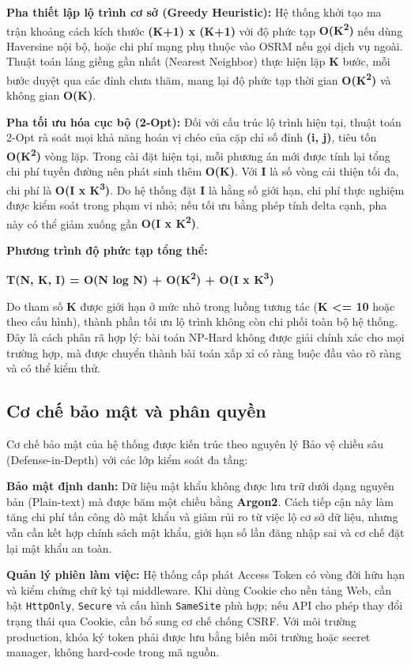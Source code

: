 \documentclass[12pt, a4paper]{article}
\begin{document}
\textbf{Pha thiết lập lộ trình cơ sở (Greedy Heuristic):}
Hệ thống khởi tạo ma trận khoảng cách kích thước \textbf{(K+1) x (K+1)} với độ phức tạp \textbf{O(K\textsuperscript{2})} nếu dùng Haversine nội bộ, hoặc chi phí mạng phụ thuộc vào OSRM nếu gọi dịch vụ ngoài. Thuật toán láng giềng gần nhất (Nearest Neighbor) thực hiện lặp \textbf{K} bước, mỗi bước duyệt qua các đỉnh chưa thăm, mang lại độ phức tạp thời gian \textbf{O(K\textsuperscript{2})} và không gian \textbf{O(K)}.

\textbf{Pha tối ưu hóa cục bộ (2-Opt):}
Đối với cấu trúc lộ trình hiện tại, thuật toán 2-Opt rà soát mọi khả năng hoán vị chéo của cặp chỉ số đỉnh \textbf{(i, j)}, tiêu tốn \textbf{O(K\textsuperscript{2})} vòng lặp. Trong cài đặt hiện tại, mỗi phương án mới được tính lại tổng chi phí tuyến đường nên phát sinh thêm \textbf{O(K)}. Với \textbf{I} là số vòng cải thiện tối đa, chi phí là \textbf{O(I x K\textsuperscript{3})}. Do hệ thống đặt \textbf{I} là hằng số giới hạn, chi phí thực nghiệm được kiểm soát trong phạm vi nhỏ; nếu tối ưu bằng phép tính delta cạnh, pha này có thể giảm xuống gần \textbf{O(I x K\textsuperscript{2})}.

\textbf{Phương trình độ phức tạp tổng thể:}
\begin{center}
\textbf{T(N, K, I) = O(N log N) + O(K\textsuperscript{2}) + O(I x K\textsuperscript{3})}
\end{center}
Do tham số \textbf{K} được giới hạn ở mức nhỏ trong luồng tương tác (\textbf{K <= 10} hoặc theo cấu hình), thành phần tối ưu lộ trình không còn chi phối toàn bộ hệ thống. Đây là cách phân rã hợp lý: bài toán NP-Hard không được giải chính xác cho mọi trường hợp, mà được chuyển thành bài toán xấp xỉ có ràng buộc đầu vào rõ ràng và có thể kiểm thử.

\subsection{Cơ chế bảo mật và phân quyền}
Cơ chế bảo mật của hệ thống được kiến trúc theo nguyên lý Bảo vệ chiều sâu (Defense-in-Depth) với các lớp kiểm soát đa tầng:

\textbf{Bảo mật định danh:} Dữ liệu mật khẩu không được lưu trữ dưới dạng nguyên bản (Plain-text) mà được băm một chiều bằng \textbf{Argon2}. Cách tiếp cận này làm tăng chi phí tấn công dò mật khẩu và giảm rủi ro từ việc lộ cơ sở dữ liệu, nhưng vẫn cần kết hợp chính sách mật khẩu, giới hạn số lần đăng nhập sai và cơ chế đặt lại mật khẩu an toàn.

\textbf{Quản lý phiên làm việc:} Hệ thống cấp phát Access Token có vòng đời hữu hạn và kiểm chứng chữ ký tại middleware. Khi dùng Cookie cho nền tảng Web, cần bật \texttt{HttpOnly}, \texttt{Secure} và cấu hình \texttt{SameSite} phù hợp; nếu API cho phép thay đổi trạng thái qua Cookie, cần bổ sung cơ chế chống CSRF. Với môi trường production, khóa ký token phải được lưu bằng biến môi trường hoặc secret manager, không hard-code trong mã nguồn.
\end{document}
